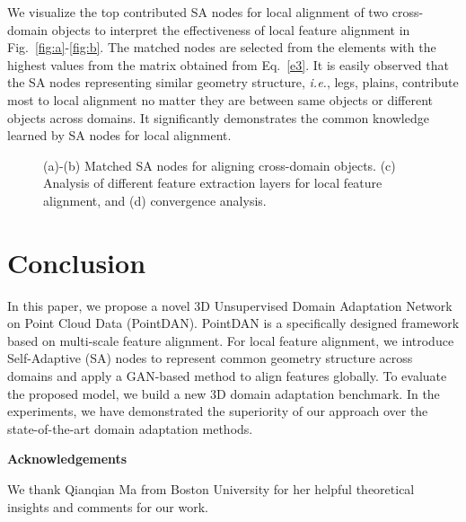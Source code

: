 \documentclass{article}
\newcommand*\ie{\textit{i.e.}}
\begin{document}
We visualize the top contributed SA nodes for local alignment of two cross-domain objects to interpret the effectiveness of local feature alignment in Fig.~\ref{fig:a}-\ref{fig:b}. The matched nodes are selected from the elements with the highest values from the matrix  obtained from Eq.~\ref{e3}. It is easily observed that the SA nodes representing similar geometry structure, \ie, legs, plains, contribute most to local alignment no matter they are between same objects or different objects across domains. It significantly demonstrates the common knowledge learned by SA nodes for local alignment.
\begin{figure}[t!]
\centering
{}

\caption{(a)-(b) Matched SA nodes for aligning cross-domain objects. (c) Analysis of different feature extraction layers for local feature alignment, and (d) convergence analysis.}\label{f3} 

\end{figure}




\section{Conclusion}
In this paper, we propose a novel 3D Unsupervised Domain Adaptation Network on Point Cloud Data (PointDAN). PointDAN is a specifically designed framework based on multi-scale feature alignment. For local feature alignment, we introduce Self-Adaptive (SA) nodes to represent common geometry structure across domains and apply a GAN-based method to align features globally. To evaluate the proposed model, we build a new 3D domain adaptation benchmark. In the experiments, we have demonstrated the superiority of our approach over the state-of-the-art domain adaptation methods.

\textbf{Acknowledgements}

We thank Qianqian Ma from Boston University for her helpful theoretical insights and comments for our work.



\end{document}

